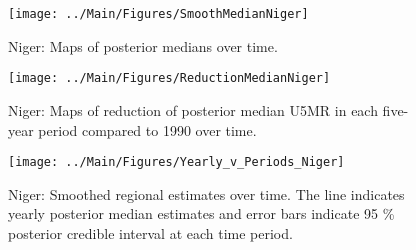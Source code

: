 \documentclass[12pt]{article}\usepackage[]{graphicx}\usepackage[]{color}
\newenvironment{knitrout}{}{} %
\begin{document}
\begin{knitrout}
\color{fgcolor}\begin{figure}[bht]

{\centering \texttt{[image: ../Main/Figures/SmoothMedianNiger]} 

}

\caption[Niger]{Niger: Maps of posterior medians over time.}\label{fig:unnamed-chunk-254}
\end{figure}


\end{knitrout}
\begin{knitrout}
\color{fgcolor}\begin{figure}[bht]

{\centering \texttt{[image: ../Main/Figures/ReductionMedianNiger]} 

}

\caption[Niger]{Niger: Maps of reduction of posterior median U5MR in each five-year period compared to 1990 over time.}\label{fig:unnamed-chunk-255}
\end{figure}


\end{knitrout}
\begin{knitrout}
\color{fgcolor}\begin{figure}[bht]

{\centering \texttt{[image: ../Main/Figures/Yearly\_v\_Periods\_Niger]} 

}

\caption[Niger]{Niger: Smoothed regional estimates over time. The line indicates yearly posterior median estimates and error bars indicate 95 \% posterior credible interval at each time period.}\label{fig:unnamed-chunk-256}
\end{figure}


\end{knitrout}
\end{document}
